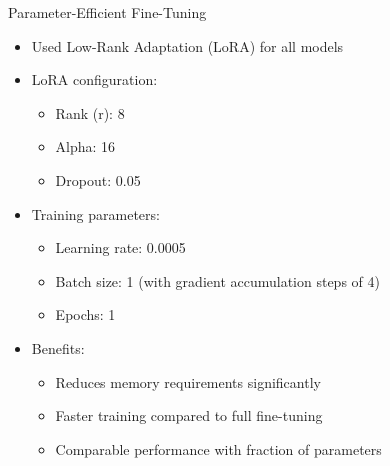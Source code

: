 \documentclass{beamer}
\begin{document}
\begin{frame}{Parameter-Efficient Fine-Tuning}
\begin{itemize}
    \item Used Low-Rank Adaptation (LoRA) for all models
    \item LoRA configuration:
    \begin{itemize}
        \item Rank (r): 8
        \item Alpha: 16
        \item Dropout: 0.05
    \end{itemize}
    \item Training parameters:
    \begin{itemize}
        \item Learning rate: 0.0005
        \item Batch size: 1 (with gradient accumulation steps of 4)
        \item Epochs: 1
    \end{itemize}
    \item Benefits:
    \begin{itemize}
        \item Reduces memory requirements significantly
        \item Faster training compared to full fine-tuning
        \item Comparable performance with fraction of parameters
    \end{itemize}
\end{itemize}
\end{frame}
\end{document}
